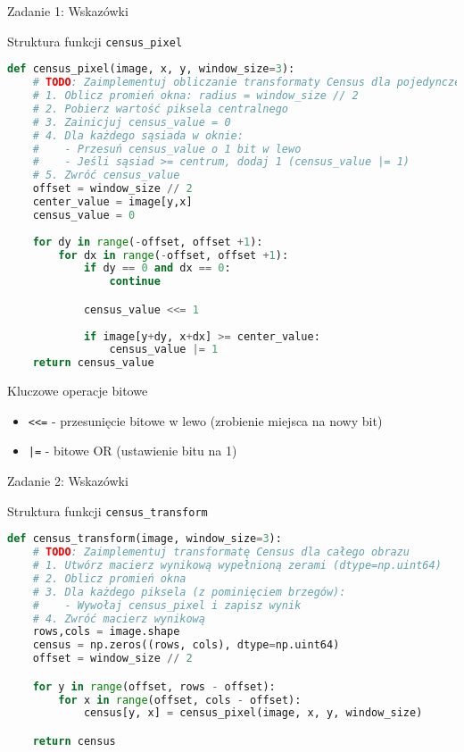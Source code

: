 \documentclass[9pt]{beamer}
\begin{document}
\begin{frame}[fragile]{Zadanie 1: Wskazówki}
\begin{block}{Struktura funkcji \texttt{census\_pixel}}
\begin{lstlisting}[language=Python, basicstyle=\tiny\ttfamily]
def census_pixel(image, x, y, window_size=3):
    # TODO: Zaimplementuj obliczanie transformaty Census dla pojedynczego piksela
    # 1. Oblicz promień okna: radius = window_size // 2
    # 2. Pobierz wartość piksela centralnego
    # 3. Zainicjuj census_value = 0
    # 4. Dla każdego sąsiada w oknie:
    #    - Przesuń census_value o 1 bit w lewo
    #    - Jeśli sąsiad >= centrum, dodaj 1 (census_value |= 1)
    # 5. Zwróć census_value
    offset = window_size // 2
    center_value = image[y,x]
    census_value = 0
    
    for dy in range(-offset, offset +1):
        for dx in range(-offset, offset +1):
            if dy == 0 and dx == 0:
                continue

            census_value <<= 1
            
            if image[y+dy, x+dx] >= center_value:
                census_value |= 1
    return census_value
\end{lstlisting}
\end{block}

\begin{alertblock}{Kluczowe operacje bitowe}
\begin{itemize}
\item \texttt{<<=} - przesunięcie bitowe w lewo (zrobienie miejsca na nowy bit)
\item \texttt{|=} - bitowe OR (ustawienie bitu na 1)
\end{itemize}
\end{alertblock}


\end{frame}

\begin{frame}[fragile]{Zadanie 2: Wskazówki}
\begin{block}{Struktura funkcji \texttt{census\_transform}}
\begin{lstlisting}[language=Python]%, basicstyle=\tiny\ttfamily]
def census_transform(image, window_size=3):
    # TODO: Zaimplementuj transformatę Census dla całego obrazu
    # 1. Utwórz macierz wynikową wypełnioną zerami (dtype=np.uint64)
    # 2. Oblicz promień okna
    # 3. Dla każdego piksela (z pominięciem brzegów):
    #    - Wywołaj census_pixel i zapisz wynik
    # 4. Zwróć macierz wynikową
    rows,cols = image.shape
    census = np.zeros((rows, cols), dtype=np.uint64)
    offset = window_size // 2

    for y in range(offset, rows - offset):
        for x in range(offset, cols - offset):
            census[y, x] = census_pixel(image, x, y, window_size)

    return census
\end{lstlisting}
\end{block}
\end{frame}
\end{document}
